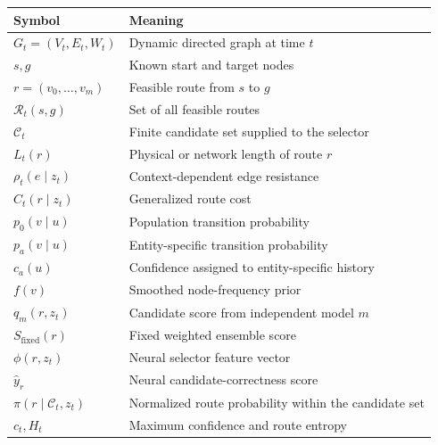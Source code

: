 \documentclass[11pt,letterpaper]{article}
\newcommand{\Rcal}{\mathcal{R}}
\newcommand{\Ccal}{\mathcal{C}}
\begin{document}
\begin{table}[htbp]
\centering
\begin{tabularx}{\textwidth}{>{\raggedright\arraybackslash}p{} X}
\toprule
\textbf{Symbol} & \textbf{Meaning} \\
\midrule
$G_t=(V_t,E_t,W_t)$ & Dynamic directed graph at time $t$ \\
$s,g$ & Known start and target nodes \\
$r=(v_0,\ldots,v_m)$ & Feasible route from $s$ to $g$ \\
$\Rcal_t(s,g)$ & Set of all feasible routes \\
$\Ccal_t$ & Finite candidate set supplied to the selector \\
$L_t(r)$ & Physical or network length of route $r$ \\
$\rho_t(e\mid z_t)$ & Context-dependent edge resistance \\
$C_t(r\mid z_t)$ & Generalized route cost \\
$p_0(v\mid u)$ & Population transition probability \\
$p_a(v\mid u)$ & Entity-specific transition probability \\
$c_a(u)$ & Confidence assigned to entity-specific history \\
$f(v)$ & Smoothed node-frequency prior \\
$q_m(r,z_t)$ & Candidate score from independent model $m$ \\
$S_{\mathrm{fixed}}(r)$ & Fixed weighted ensemble score \\
$\phi(r,z_t)$ & Neural selector feature vector \\
$\widehat y_r$ & Neural candidate-correctness score \\
$\pi(r\mid\Ccal_t,z_t)$ & Normalized route probability within the candidate set \\
$c_t,H_t$ & Maximum confidence and route entropy \\
\bottomrule
\end{tabularx}
\end{table}
\end{document}
